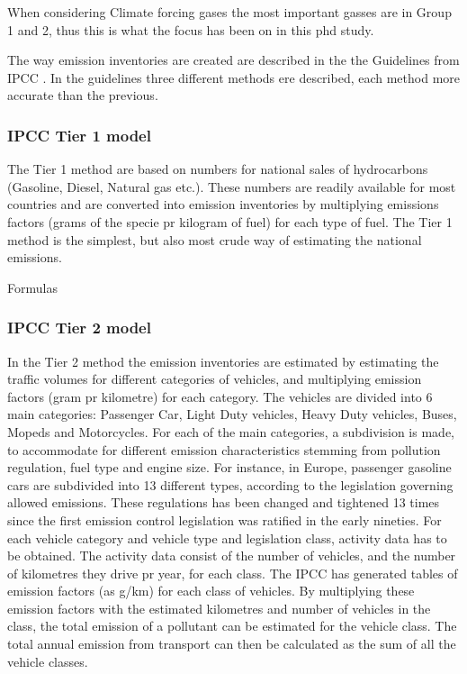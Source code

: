 When considering Climate forcing gases the most important gasses are in Group 1 and 2, thus this is what the focus has been on in this phd study.

The way emission inventories are created are described in the the Guidelines from IPCC . In the guidelines three different methods ere described, each method more accurate than the previous. 

\subsubsection{IPCC Tier 1 model} 

The Tier 1 method are based on numbers for national sales of hydrocarbons (Gasoline, Diesel, Natural gas etc.). These numbers are readily available for most countries and are converted into emission inventories by multiplying emissions factors (grams of the specie pr kilogram of fuel) for each type of fuel. The Tier 1 method is the simplest, but also most crude way of estimating the national emissions.

Formulas

\subsubsection{IPCC Tier 2 model} 
In the Tier 2 method the emission inventories are estimated by estimating the traffic volumes for different categories of vehicles, and multiplying emission factors (gram pr kilometre) for each category. The vehicles are divided into 6 main categories: Passenger Car, Light Duty vehicles, Heavy Duty vehicles, Buses, Mopeds and Motorcycles. For each of the main categories, a subdivision is made, to accommodate for different emission characteristics stemming from pollution regulation, fuel type and engine size. For instance, in Europe, passenger gasoline cars are subdivided into 13 different types, according to the legislation governing allowed emissions. These regulations has been changed and tightened 13 times since the first emission control legislation was ratified in the early nineties. For each vehicle category and vehicle type and legislation class, activity data has to be obtained. The activity data consist of the number of vehicles, and the number of kilometres they drive pr year, for each class. The IPCC has generated tables of emission factors (as g/km) for each class of vehicles. By multiplying these emission factors with the estimated kilometres and number of vehicles in the class, the total emission of a pollutant can be estimated for the vehicle class. The total annual emission from transport can then be calculated as the sum of all the vehicle classes.


